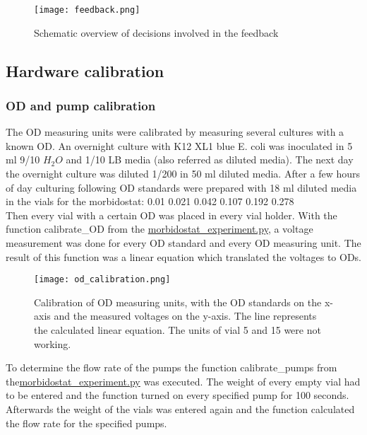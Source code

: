 \begin{figure}
	\texttt{[image: feedback.png]}
	\caption{Schematic overview of decisions involved in the feedback}
	\label{figure:feedback}
\end{figure}

\subsection{Hardware calibration}
\subsubsection{OD and pump calibration}
The OD measuring units were calibrated by measuring several cultures with a known OD.
An overnight culture with K12 XL1 blue E. coli was inoculated in 5 ml 9/10 $H_2O$ and 1/10 LB media (also referred as diluted media). The next day the overnight culture was diluted 1/200 in 50 ml diluted media. After a few hours of day culturing following OD standards were prepared with 18 ml diluted media in the vials for the morbidostat: 0.01 0.021 0.042 0.107 0.192 0.278\\
Then every vial with a certain OD was placed in every vial holder. With the function calibrate\_OD from the \href{https://github.com/nahanoo/ESBL\_project/}{morbidostat\_experiment.py}, a voltage measurement was done for every OD standard and every OD measuring unit. The result of this function was a linear equation which translated the voltages to ODs. \\
\begin{figure}[H]
	\texttt{[image: od\_calibration.png]}
	\caption{Calibration of OD measuring units, with the OD standards on the x-axis and the measured voltages on the y-axis. The line represents the calculated linear equation. The units of vial 5 and 15 were not working.}
\end{figure}
To determine the flow rate of the pumps the function calibrate\_pumps from the\href{https://github.com/nahanoo/ESBL\_project/}{morbidostat\_experiment.py} was executed. The weight of every empty vial had to be entered and the function turned on every specified pump for 100 seconds. Afterwards the weight of the vials was entered again and the function calculated the flow rate for the specified pumps. 
\label{section:OD_calibration}

